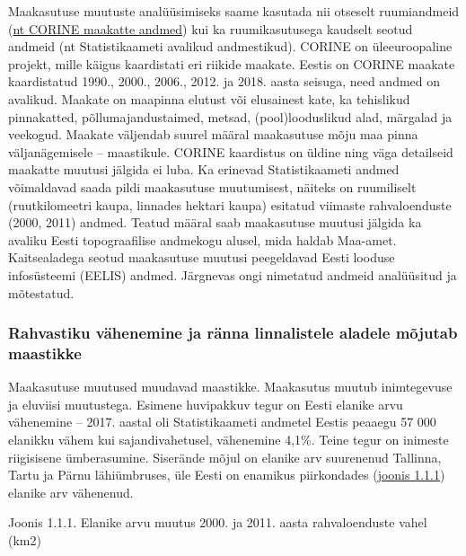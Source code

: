 \documentclass[estonian,]{article}
\begin{document}
Maakasutuse muutuste analüüsimiseks saame kasutada nii otseselt ruumiandmeid (\protect\hyperlink{CORINE}{nt CORINE maakatte andmed}) kui ka ruumikasutusega kaudselt seotud andmeid (nt Statistikaameti avalikud andmestikud). CORINE on üleeuroopaline projekt, mille käigus kaardistati eri riikide maakate. Eestis on CORINE maakate kaardistatud 1990., 2000., 2006., 2012. ja 2018. aasta seisuga, need andmed on avalikud. Maakate on maapinna elutust või elusainest kate, ka tehislikud pinnakatted, põllumajandustaimed, metsad, (pool)looduslikud alad, märgalad ja veekogud. Maakate väljendab suurel määral maakasutuse mõju maa pinna väljanägemisele -- maastikule. CORINE kaardistus on üldine ning väga detailseid maakatte muutusi jälgida ei luba. Ka erinevad Statistikaameti andmed võimaldavad saada pildi maakasutuse muutumisest, näiteks on ruumiliselt (ruutkilomeetri kaupa, linnades hektari kaupa) esitatud viimaste rahvaloenduste (2000, 2011) andmed. Teatud määral saab maakasutuse muutusi jälgida ka avaliku Eesti topograafilise andmekogu alusel, mida haldab Maa-amet. Kaitsealadega seotud maakasutuse muutusi peegeldavad Eesti looduse infosüsteemi (EELIS) andmed. Järgnevas ongi nimetatud andmeid analüüsitud ja mõtestatud.

\hypertarget{rahvastiku-vuxe4henemine-ja-ruxe4nna-linnalistele-aladele-muxf5jutab-maastikke}{%
\subsubsection*{Rahvastiku vähenemine ja ränna linnalistele aladele mõjutab maastikke}\label{rahvastiku-vuxe4henemine-ja-ruxe4nna-linnalistele-aladele-muxf5jutab-maastikke}}

Maakasutuse muutused muudavad maastikke. Maakasutus muutub inimtegevuse ja eluviisi muutustega. Esimene huvipakkuv tegur on Eesti elanike arvu vähenemine -- 2017. aastal oli Statistikaameti andmetel Eestis peaaegu 57 000 elanikku vähem kui sajandivahetusel, vähenemine 4,1\%. Teine tegur on inimeste riigisisene ümberasumine. Siserände mõjul on elanike arv suurenenud Tallinna, Tartu ja Pärnu lähiümbruses, üle Eesti on enamikus piirkondades (\protect\hyperlink{figure111}{joonis 1.1.1}) elanike arv vähenenud.

{Joonis 1.1.1.} Elanike arvu muutus 2000. ja 2011. aasta rahvaloenduste vahel (km2)
\end{document}
